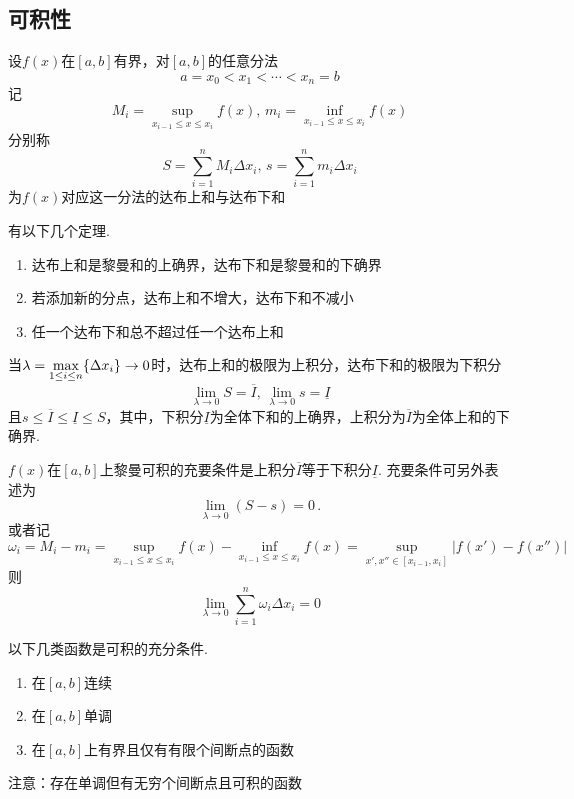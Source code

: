 \subsection{可积性}
\begin{definition}[达布(Darboux)和]
设$f(x)$在$[a,b]$有界，对$[a,b]$的任意分法
\[a=x_0<x_1<\cdots<x_n=b\]
记
\[M_i=\sup_{x_{i-1}\leq x\leq x_i}f(x),\,m_i=\inf_{x_{i-1}\leq x\leq x_i}f(x)\]
分别称
\[S=\sum_{i=1}^nM_i\Delta x_i,\,s=\sum_{i=1}^nm_i\Delta x_i\]
为$f(x)$对应这一分法的达布上和与达布下和
\end{definition}
\par 有以下几个定理.
\begin{theorem}\mbox{}\par
\begin{enumerate}
	\itemsep-3pt
	\item 达布上和是黎曼和的上确界，达布下和是黎曼和的下确界
	\item 若添加新的分点，达布上和不增大，达布下和不减小
	\item 任一个达布下和总不超过任一个达布上和
\end{enumerate}
\end{theorem}
\begin{theorem}[达布定理]
当$\displaystyle\lambda=\max_{1\leq i\leq n}\{\Delta x_i\}\to 0$时，达布上和的极限为上积分，达布下和的极限为下积分
\[\lim_{\lambda\to 0}S=\overline{I},\,\lim_{\lambda\to 0}s=\underline{I}\]
且$s\leq\overline{I}\leq\underline{I}\leq S$，其中，下积分$\underline{I}$为全体下和的上确界，上积分为$\overline{I}$为全体上和的下确界.
\end{theorem}
\begin{theorem}[可积的充要条件]
$f(x)$在$[a,b]$上黎曼可积的充要条件是上积分$\overline{I}$等于下积分$\underline{I}$.
充要条件可另外表述为
\[\lim_{\lambda\to 0}(S-s)=0\,.\]
或者记
\[\omega_i=M_i-m_i=\sup_{x_{i-1}\leq x\leq x_i}f(x)-\inf_{x_{i-1}\leq x\leq x_i}f(x)=\sup_{x',x''\in[x_{i-1},x_i]}|f(x')-f(x'')|\]
则
\[\lim_{\lambda\to 0}\sum_{i=1}^n\omega_i\Delta x_i=0\]
\end{theorem}
\par 以下几类函数是可积的充分条件.
\begin{enumerate}
	\itemsep -3pt
	\item 在$[a,b]$连续
	\item 在$[a,b]$单调
	\item 在$[a,b]$上有界且仅有有限个间断点的函数
\end{enumerate}
\par 注意：存在单调但有无穷个间断点且可积的函数
